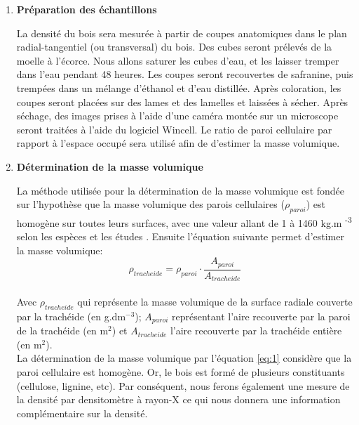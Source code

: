\documentclass{report}
\begin{document}
\begin{enumerate}
	 

\item \textbf{Préparation des échantillons}

La densité du bois sera mesurée à partir de coupes anatomiques dans le plan radial-tangentiel (ou transversal) du bois. Des cubes seront prélevés de la moelle à l'écorce. Nous allons saturer les cubes d'eau, et les laisser tremper dans l'eau pendant 48 heures. Les coupes seront recouvertes de safranine, puis trempées dans un mélange d'éthanol et d'eau distillée. Après coloration, les coupes seront placées sur des lames et des lamelles et laissées à sécher. Après séchage, des images prises à l'aide d'une caméra montée sur un microscope seront traitées à l'aide du logiciel Wincell. Le ratio de paroi cellulaire par rapport à l'espace occupé sera utilisé afin de d'estimer la masse volumique. \\

\item \textbf{Détermination de la masse volumique}

La méthode utilisée pour la détermination de la masse volumique est fondée sur l'hypothèse que la masse volumique des parois cellulaires ($\rho_{paroi}$) est homogène sur toutes leurs surfaces, avec une valeur allant de 1 à 1460 kg.m \textsuperscript{-3} selon les espèces et les études \citep{Decoux2004}. Ensuite l'équation suivante permet d'estimer la masse volumique: \\

\begin{equation}\label{eq:1}
\rho_{tracheide} = \rho_{paroi}\cdot\frac{A_{paroi}}{A_{tracheide}}
\end{equation}\\

Avec $\rho_{tracheide}$ qui représente la masse volumique de la surface radiale couverte par la trachéide (en g.dm$^{-3}$); $A_{paroi}$ représentant l'aire recouverte par la paroi de la trachéide (en m$^{2}$) et $A_{tracheide}$ l'aire recouverte par la trachéide entière (en m$^{2}$).\\

La détermination de la masse volumique par l'équation \ref{eq:1} considère que la paroi cellulaire est homogène. Or, le bois est formé de plusieurs constituants (cellulose, lignine, etc). Par conséquent, nous ferons également une mesure de la densité par densitomètre à rayon-X ce qui nous donnera une information complémentaire sur la densité.
\end{enumerate}
\end{document}
